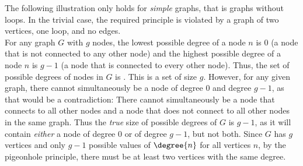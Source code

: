 The following illustration only holds for \textit{simple} graphs, that is graphs without loops. In the trivial case, the required principle is violated by a graph of two vertices, one loop, and no edges. \\

\noindent For any graph $G$ with $ g $ nodes, the lowest possible degree of a node $ n $ is 0 (a node that is not connected to any other node) and the highest possible degree of a node $ n $ is $g-1$ (a node that is connected to every other node). Thus, the set of possible degrees of nodes in $G$ is . This is a set of size $g$. However, for any given graph, there cannot simultaneously be a node of degree $ 0 $ and degree $ g-1 $, as that would be a contradiction: There cannot simultaneously be a node that connects to all other nodes and a node that does not connect to all other nodes in the same graph. Thus the \textit{true} size of possible degrees of $ G $ is $g-1$, as it will contain \textit{either} a node of degree $0$ or of degree $g-1$, but not both. Since $G$ has $g$ vertices and only $g-1$ possible values of $\degree{n}$ for all vertices $n$, by the pigeonhole principle, there must be at least two vertices with the same degree.